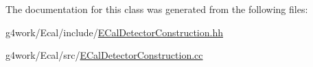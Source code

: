 The documentation for this class was generated from the following files\-:\begin{DoxyCompactItemize}
\item 
g4work/\-Ecal/include/\hyperlink{_e_cal_detector_construction_8hh}{E\-Cal\-Detector\-Construction.\-hh}\item 
g4work/\-Ecal/src/\hyperlink{_e_cal_detector_construction_8cc}{E\-Cal\-Detector\-Construction.\-cc}\end{DoxyCompactItemize}
